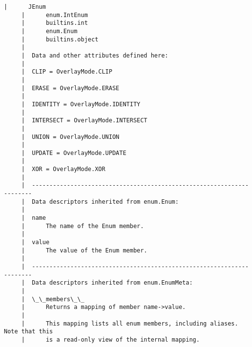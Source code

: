 \documentclass[11pt]{article}
\begin{document}
\begin{Verbatim}[commandchars=\\\{\}]
     |      JEnum
     |      enum.IntEnum
     |      builtins.int
     |      enum.Enum
     |      builtins.object
     |  
     |  Data and other attributes defined here:
     |  
     |  CLIP = OverlayMode.CLIP
     |  
     |  ERASE = OverlayMode.ERASE
     |  
     |  IDENTITY = OverlayMode.IDENTITY
     |  
     |  INTERSECT = OverlayMode.INTERSECT
     |  
     |  UNION = OverlayMode.UNION
     |  
     |  UPDATE = OverlayMode.UPDATE
     |  
     |  XOR = OverlayMode.XOR
     |  
     |  ----------------------------------------------------------------------
     |  Data descriptors inherited from enum.Enum:
     |  
     |  name
     |      The name of the Enum member.
     |  
     |  value
     |      The value of the Enum member.
     |  
     |  ----------------------------------------------------------------------
     |  Data descriptors inherited from enum.EnumMeta:
     |  
     |  \_\_members\_\_
     |      Returns a mapping of member name->value.
     |      
     |      This mapping lists all enum members, including aliases. Note that this
     |      is a read-only view of the internal mapping.
    

\end{Verbatim}
\end{document}
